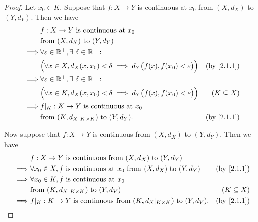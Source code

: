 \begin{proof}
  Let \(x_0 \in K\).
  Suppose that \(f : X \to Y\) is continuous at \(x_0\) from \((X, d_X)\) to \((Y, d_Y)\).
  Then we have
  \begin{align*}
             & f : X \to Y \text{ is continuous at } x_0                                                                                   \\
             & \text{from } (X, d_X) \text{ to } (Y, d_Y)                                                                                  \\
    \implies & \forall \varepsilon \in \R^+, \exists\ \delta \in \R^+ :                                                                    \\
             & \Big(\forall x \in X, d_X(x, x_0) < \delta \implies d_Y\big(f(x), f(x_0) < \varepsilon\big)\Big) & \text{(by \cref{2.1.1})} \\
    \implies & \forall \varepsilon \in \R^+, \exists\ \delta \in \R^+ :                                                                    \\
             & \Big(\forall x \in K, d_X(x, x_0) < \delta \implies d_Y\big(f(x), f(x_0) < \varepsilon\big)\Big) & (K \subseteq X)          \\
    \implies & f|_K : K \to Y \text{ is continuous at } x_0                                                                                \\
             & \text{from } (K, d_X|_{K \times K}) \text{ to } (Y, d_Y).                                        & \text{(by \cref{2.1.1})}
  \end{align*}

  Now suppose that \(f : X \to Y\) is continuous from \((X, d_X)\) to \((Y, d_Y)\).
  Then we have
  \begin{align*}
             & f : X \to Y \text{ is continuous from } (X, d_X) \text{ to } (Y, d_Y)                                                     \\
    \implies & \forall x_0 \in X, f \text{ is continuous at } x_0 \text{ from } (X, d_X) \text{ to } (Y, d_Y) & \text{(by \cref{2.1.1})} \\
    \implies & \forall x_0 \in K, f \text{ is continuous at } x_0                                                                        \\
             & \text{from } (K, d_X|_{K \times K}) \text{ to } (Y, d_Y)                                       & (K \subseteq X)          \\
    \implies & f|_K : K \to Y \text{ is continuous from } (K, d_X|_{K \times K}) \text{ to } (Y, d_Y).        & \text{(by \cref{2.1.1})}
  \end{align*}
\end{proof}

